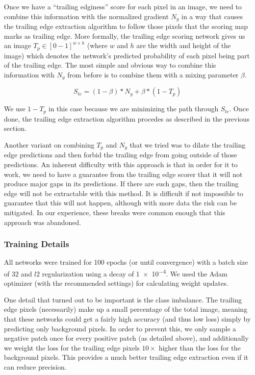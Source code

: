 Once we have a ``trailing edginess'' score for each pixel in an image, we need to combine this information with the normalized gradient $N_y$ in a way that causes the trailing edge extraction algorithm to follow those pixels that the scoring map marks as trailing edge.
More formally, the trailing edge scoring network gives us an image $T_p \in [0-1]^{w \times h}$ (where $w$ and $h$ are the width and height of the image) which denotes the network's predicted probability of each pixel being part of the trailing edge.
The most simple and obvious way to combine this information with $N_y$ from before is to combine them with a mixing parameter $\beta$.

\begin{equation}
S_{te} = (1 - \beta)*N_y + \beta*(1 - T_p)
\end{equation}

We use $1 - T_p$ in this case because we are minimizing the path through $S_{te}$.
Once done, the trailing edge extraction algorithm procedes as described in the previous section.

Another variant on combining $T_p$ and $N_y$ that we tried was to dilate the trailing edge predictions and then forbid the trailing edge from going outside of those predictions.
An inherent difficulty with this approach is that in order for it to work, we need to have a guarantee from the trailing edge scorer that it will not produce major gaps in its predictions.
If there are such gaps, then the trailing edge will not be extractable with this method.
It is difficult if not impossible to guarantee that this will not happen, although with more data the risk can be mitigated.
In our experience, these breaks were common enough that this approach was abandoned.

\subsubsection{Training Details}

All networks were trained for 100 epochs (or until convergence) with a batch size of $32$ and $l2$ regularization using a decay of \num{1e-4}.
We used the Adam optimizer \cite{kingma2014adam} (with the recommended settings) for calculating weight updates.

One detail that turned out to be important is the class imbalance.
The trailing edge pixels (necessarily) make up a small percentage of the total image, meaning that these networks could get a fairly high accuracy (and thus low loss) simply by predicting only background pixels.
In order to prevent this, we only sample a negative patch once for every positive patch (as detailed above), and additionally we weight the loss for the trailing edge pixels $10\times$ higher than the loss for the background pixels.
This provides a much better trailing edge extraction even if it can reduce precision.

